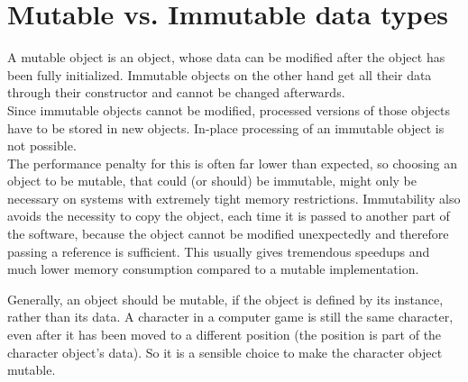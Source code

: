 	\section{Mutable vs. Immutable data types}
		A mutable object is an object, whose data can be modified after the object has been fully initialized.
		Immutable objects on the other hand get all their data through their constructor and cannot be changed afterwards.\\
		Since immutable objects cannot be modified, processed versions of those objects have to be stored in new objects.
		In-place processing of an immutable object is not possible.\\
		The performance penalty for this is often far lower than expected, so choosing an object to be mutable, that could (or should) be immutable, might only be necessary on systems with extremely tight memory restrictions.
		Immutability also avoids the necessity to copy the object, each time it is passed to another part of the software, because the object cannot be modified unexpectedly and therefore passing a reference is sufficient.
		This usually gives tremendous speedups and much lower memory consumption compared to a mutable implementation.

		Generally, an object should be mutable, if the object is defined by its instance, rather than its data.
		A character in a computer game is still the same character, even after it has been moved to a different position (the position is part of the character object's data).
		So it is a sensible choice to make the character object mutable.


